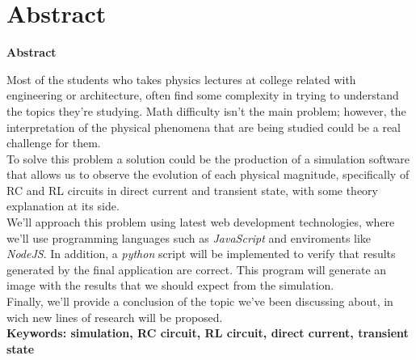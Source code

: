 \documentclass[../main.tex]{subfiles}
\begin{document}
\makeatletter
\renewenvironment{abstract}{%
    \if@twocolumn
      \section*{Abstract \\}%
    \else %
    \begin{flushright}
        {\filleft\Huge\bfseries\fontsize{48pt}{12}\selectfont Abstract\vspace{\z@}}%
        \end{flushright}
      \quotation
    \fi}
    {\if@twocolumn\else\endquotation\fi}
\makeatother
\begin{abstract}

Most of the students who takes physics lectures at college related with engineering or architecture, often find some complexity in trying to understand the topics they're studying. Math difficulty isn't the main problem; however, the interpretation of the physical phenomena that are being studied could be a real challenge for them.\\

To solve this problem a solution could be the production of a simulation software that allows us to observe the evolution of each physical magnitude, specifically of RC and RL circuits in direct current and transient state, with some theory explanation at its side. \\

We'll approach this problem using latest web development technologies, where we'll use programming languages such as \textit{JavaScript} and enviroments like \textit{NodeJS}. In addition, a \textit{python} script will be implemented to verify that results generated by the final  application are correct. This program will generate an image with the results that we should expect from the simulation.\\ 

Finally, we'll provide a conclusion of the topic we've been discussing about, in wich new lines of research will be proposed.\\



\bfseries{\large{Keywords:}} simulation, RC circuit, RL circuit, direct current, transient state

\end{abstract}
\end{document}
